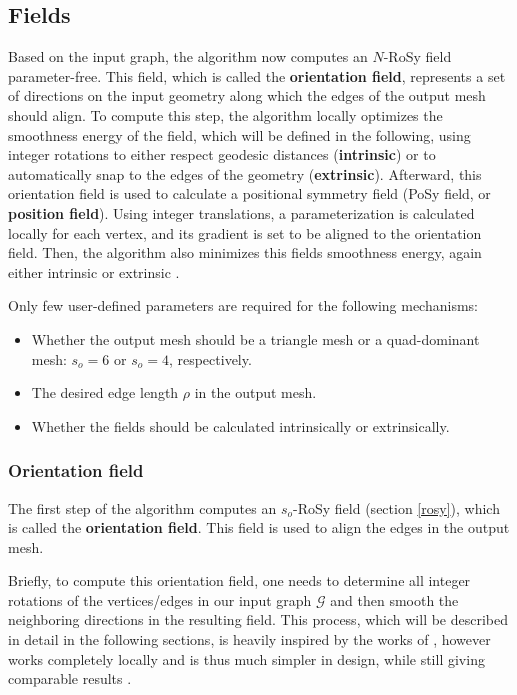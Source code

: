 \documentclass{ACGSeminar}
\begin{document}
\subsection{Fields}
Based on the input graph, the algorithm now computes an $N$-RoSy field parameter-free. This field, which is called the \textbf{orientation field}, represents a set of directions on the input geometry along which the edges of the output mesh should align. To compute this step, the algorithm locally optimizes the smoothness energy of the field, which will be defined in the following, using integer rotations to either respect geodesic distances (\textbf{intrinsic}) or to automatically snap to the edges of the geometry (\textbf{extrinsic}). Afterward, this orientation field is used to calculate a positional symmetry field (PoSy field, or \textbf{position field}). Using integer translations, a parameterization is calculated locally for each vertex, and its gradient is set to be aligned to the orientation field. Then, the algorithm also minimizes this fields smoothness energy, again either intrinsic or extrinsic \cite{jakob2015instant}.\bigskip

Only few user-defined parameters are required for the following mechanisms:
\begin{itemize}
	\item	Whether the output mesh should be a triangle mesh or a quad-dominant mesh: $s_o = 6$ or $s_o = 4$, respectively.
	\item	The desired edge length $\rho$ in the output mesh.
	\item	Whether the fields should be calculated intrinsically or extrinsically.
\end{itemize}

\subsubsection{Orientation field}\label{orientation-field}
The first step of the algorithm computes an $s_o$-RoSy field (section \ref{rosy}), which is called the \textbf{orientation field}. This field is used to align the edges in the output mesh.\bigskip

Briefly, to compute this orientation field, one needs to determine all integer rotations of the vertices/edges in our input graph $\mathcal{G}$ and then smooth the neighboring directions in the resulting field. This process, which will be described in detail in the following sections, is heavily inspired by the works of \cite{bommes2009mixed,ray2008n}, however works completely locally and is thus much simpler in design, while still giving comparable results \cite{jakob2015instant}.
\end{document}
